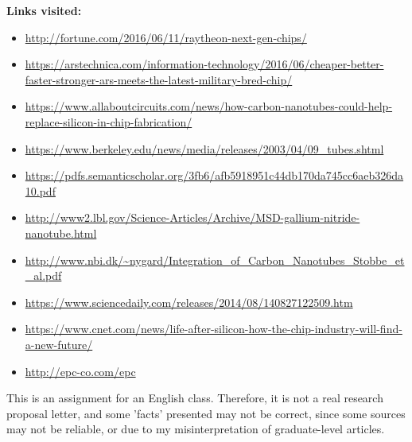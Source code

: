 \documentclass[letterpaper]{letter}
\begin{document}
\newpage
\textbf{Links visited:}
\begin{itemize}
  \item \url{http://fortune.com/2016/06/11/raytheon-next-gen-chips/}
  \item \url{https://arstechnica.com/information-technology/2016/06/cheaper-better-faster-stronger-ars-meets-the-latest-military-bred-chip/}
  \item \url{https://www.allaboutcircuits.com/news/how-carbon-nanotubes-could-help-replace-silicon-in-chip-fabrication/}
  \item \url{https://www.berkeley.edu/news/media/releases/2003/04/09_tubes.shtml}
  \item \url{https://pdfs.semanticscholar.org/3fb6/afb5918951c44db170da745cc6aeb326da10.pdf}
  \item \url{http://www2.lbl.gov/Science-Articles/Archive/MSD-gallium-nitride-nanotube.html}
  \item \url{http://www.nbi.dk/~nygard/Integration_of_Carbon_Nanotubes_Stobbe_et_al.pdf}
  \item \url{https://www.sciencedaily.com/releases/2014/08/140827122509.htm}
  \item \url{https://www.cnet.com/news/life-after-silicon-how-the-chip-industry-will-find-a-new-future/}
  \item \url{http://epc-co.com/epc}
\end{itemize}
\vspace{5cm}
This is an assignment for an English class. Therefore, it is not a real research proposal letter, and some 'facts' presented
may not be correct, since some sources may not be reliable, or due to my misinterpretation of graduate-level articles.
\end{document}
